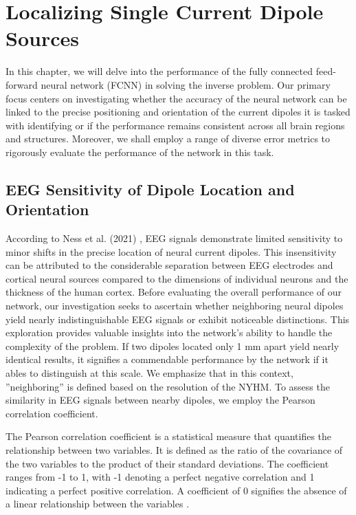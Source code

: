 \documentclass[a4paper, UKenglish, 11pt]{uiomaster}
\begin{document}
\chapter{Localizing Single Current Dipole Sources} \label{chap:simple_dipole_FFNN}
In this chapter, we will delve into the performance of the fully connected feed-forward neural network (FCNN) in solving the inverse problem. Our primary focus centers on investigating whether the accuracy of the neural network can be linked to the precise positioning and orientation of the current dipoles it is tasked with identifying or if the performance remains consistent across all brain regions and structures. Moreover, we shall employ a range of diverse error metrics to rigorously evaluate the performance of the network in this task.


\section{EEG Sensitivity of Dipole Location and Orientation}
According to Ness et al. (2021) \cite{naess2021biophysically}, EEG signals demonstrate limited sensitivity to minor shifts in the precise location of neural current dipoles. This insensitivity can be attributed to the considerable separation between EEG electrodes and cortical neural sources compared to the dimensions of individual neurons and the thickness of the human cortex. Before evaluating the overall performance of our network, our investigation seeks to ascertain whether neighboring neural dipoles yield nearly indistinguishable EEG signals or exhibit noticeable distinctions. This exploration provides valuable insights into the network's ability to handle the complexity of the problem. If two dipoles located only 1 mm apart yield nearly identical results, it signifies a commendable performance by the network if it ables to distinguish at this scale. We emphasize that  in this context, ''neighboring'' is defined based on the resolution of the NYHM. To assess the similarity in EEG signals between nearby dipoles, we employ the Pearson correlation coefficient.

The Pearson correlation coefficient is a statistical measure that quantifies the relationship between two variables. It is defined as the ratio of the covariance of the two variables to the product of their standard deviations. The coefficient ranges from -1 to 1, with -1 denoting a perfect negative correlation and 1 indicating a perfect positive correlation. A coefficient of 0 signifies the absence of a linear relationship between the variables \cite{numpy-docs}.
\end{document}
